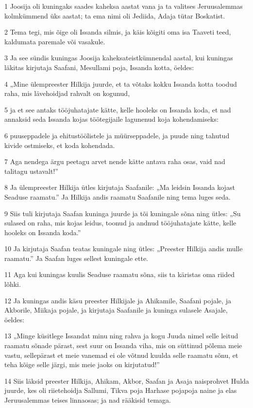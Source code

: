 \par 1 Joosija oli kuningaks saades kaheksa aastat vana ja ta valitses Jeruusalemmas kolmkümmend üks aastat; ta ema nimi oli Jediida, Adaja tütar Boskatist.
\par 2 Tema tegi, mis õige oli Issanda silmis, ja käis kõigiti oma isa Taaveti teed, kaldumata paremale või vasakule.
\par 3 Ja see sündis kuningas Joosija kaheksateistkümnendal aastal, kui kuningas läkitas kirjutaja Saafani, Mesullami poja, Issanda kotta, öeldes:
\par 4 „Mine ülempreester Hilkija juurde, et ta võtaks kokku Issanda kotta toodud raha, mis lävehoidjad rahvalt on kogunud,
\par 5 ja et see antaks tööjuhatajate kätte, kelle hooleks on Issanda koda, et nad annaksid seda Issanda kojas töötegijaile lagunenud koja kohendamiseks:
\par 6 puuseppadele ja ehitustöölistele ja müürseppadele, ja puude ning tahutud kivide ostmiseks, et koda kohendada.
\par 7 Aga nendega ärgu peetagu arvet nende kätte antava raha osas, vaid nad talitagu ustavalt!”
\par 8 Ja ülempreester Hilkija ütles kirjutaja Saafanile: „Ma leidsin Issanda kojast Seaduse raamatu.” Ja Hilkija andis raamatu Saafanile ning tema luges seda.
\par 9 Siis tuli kirjutaja Saafan kuninga juurde ja tõi kuningale sõna ning ütles: „Su sulased on raha, mis kojas leidus, toonud ja andnud tööjuhatajate kätte, kelle hooleks on Issanda koda.”
\par 10 Ja kirjutaja Saafan teatas kuningale ning ütles: „Preester Hilkija andis mulle raamatu.” Ja Saafan luges sellest kuningale ette.
\par 11 Aga kui kuningas kuulis Seaduse raamatu sõna, siis ta käristas oma riided lõhki.
\par 12 Ja kuningas andis käsu preester Hilkijale ja Ahikamile, Saafani pojale, ja Akborile, Miikaja pojale, ja kirjutaja Saafanile ja kuninga sulasele Asajale, öeldes:
\par 13 „Minge küsitlege Issandat minu ning rahva ja kogu Juuda nimel selle leitud raamatu sõnade pärast, sest suur on Issanda viha, mis on süttinud põlema meie vastu, sellepärast et meie vanemad ei ole võtnud kuulda selle raamatu sõnu, et teha kõige selle järgi, mis meie jaoks on kirjutatud!”
\par 14 Siis läksid preester Hilkija, Ahikam, Akbor, Saafan ja Asaja naisprohvet Hulda juurde, kes oli riietehoidja Sallumi, Tikva poja Harhase pojapoja naine ja elas Jeruusalemmas teises linnaosas; ja nad rääkisid temaga.
